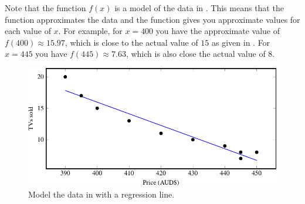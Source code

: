 \documentclass[a4paper,oneside,12pt]{article}
\begin{document}
Note that the function $f(x)$ is a model of the data in
.  This means that the function approximates the
data and the function gives you approximate values for each value of
$x$.  For example, for $x = 400$ you have the approximate value of
$f(400) \approx 15.97$, which is close to the actual value of $15$ as
given in .  For $x = 445$ you have
$f(445) \approx 7.63$, which is also close the actual value of $8$.

\begin{table}[!htbp]
\centering

\caption{%
  Details of how to use the formulae
  in~\eqref{eqn:linear_regression_alpha_hat_beta_hat} to calculate the
  regression line for the data in .  In most cases,
  you would need to round a number to two, four, or six decimal places
  in order to fit a table.  However, you should not round a number
  when you are calculating the values for $\alphahat$ and $\betahat$.
  The rounding should only be done after you have calculated the
  values for $\alphahat$ and $\betahat$.
}
\label{tab:fantastic_tv_details_regression_line}
\end{table}

\begin{figure}[!htbp]
\centering
\includegraphics[scale=1]{image/07/fantastic-tv-regression.pdf}
\caption{%
  Model the data in  with a regression line.
}
\label{fig:fantastic_tv_regression}
\end{figure}

\begin{table}[!htbp]
\centering

\caption{%
  The age~(in years) and systolic blood pressure of $30$ people.
}
\label{tab:blood_pressure}
\end{table}
\end{document}
